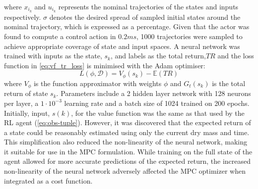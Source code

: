 where ${x}_{i_k}$ and ${u}_{i_k}$ represents the nominal trajectories of the states and inputs respectively. $\sigma$ denotes the desired spread of sampled initial states around the nominal trajectory, which is expressed as a percentage. Given that the actor was found to compute a control action in $0.2 ms$, 1000 trajectories were sampled to achieve appropriate coverage of state and input spaces.
A neural network  was trained with inputs as the state, $s_k$, and labels as the total return,$TR$ and the loss function in \autoref{eq:vf_tr_loss} is minimised with the Adam optimiser:
\begin{equation}
	\label{eq:vf_tr_loss}
	L(\phi, \mathcal{D}) =   V_{\phi}(s_k) - \mathbb{E}(TR)
\end{equation}
where $V_{\phi}$ is the function approximator with weights $\phi$ and $G_t(s_k)$ is the total return of state $s_k$. Parameters include a 2 hidden layer network with 128 neurons per layer, a $1\cdot 10^{-3}$ learning rate and a batch size of 1024 trained on 200 epochs. Initially,  input, $s(k)$, for the value function was the same as that used by the RL agent (\autoref{eq:obs-tuple}). However, it was discovered that the expected return of a state could be reasonably estimated using only the current dry mass and time. This simplification also reduced the non-linearity of the neural network, making it suitable for use in the MPC formulation. While training on the full state of the agent allowed for more accurate predictions of the expected return, the increased non-linearity of the neural network adversely affected the MPC optimizer when integrated as a cost function.


